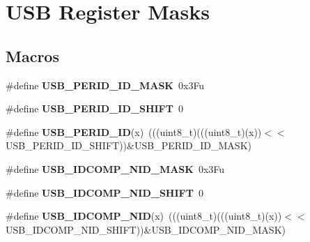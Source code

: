 \hypertarget{group__USB__Register__Masks}{}\section{U\+SB Register Masks}
\label{group__USB__Register__Masks}
\subsection*{Macros}
\begin{DoxyCompactItemize}
\item 
\#define {\bfseries U\+S\+B\+\_\+\+P\+E\+R\+I\+D\+\_\+\+I\+D\+\_\+\+M\+A\+SK}~0x3\+Fu\hypertarget{group__USB__Register__Masks_ga7c4ef4c7ba738b9ec7ee90c6c482c1e5}{}\label{group__USB__Register__Masks_ga7c4ef4c7ba738b9ec7ee90c6c482c1e5}

\item 
\#define {\bfseries U\+S\+B\+\_\+\+P\+E\+R\+I\+D\+\_\+\+I\+D\+\_\+\+S\+H\+I\+FT}~0\hypertarget{group__USB__Register__Masks_ga15b2af97cadcb108b2489e2d29e8957e}{}\label{group__USB__Register__Masks_ga15b2af97cadcb108b2489e2d29e8957e}

\item 
\#define {\bfseries U\+S\+B\+\_\+\+P\+E\+R\+I\+D\+\_\+\+ID}(x)~(((uint8\+\_\+t)(((uint8\+\_\+t)(x))$<$$<$U\+S\+B\+\_\+\+P\+E\+R\+I\+D\+\_\+\+I\+D\+\_\+\+S\+H\+I\+FT))\&U\+S\+B\+\_\+\+P\+E\+R\+I\+D\+\_\+\+I\+D\+\_\+\+M\+A\+SK)\hypertarget{group__USB__Register__Masks_gad306299b648ed1827f0b4a6ad1c81c1d}{}\label{group__USB__Register__Masks_gad306299b648ed1827f0b4a6ad1c81c1d}

\item 
\#define {\bfseries U\+S\+B\+\_\+\+I\+D\+C\+O\+M\+P\+\_\+\+N\+I\+D\+\_\+\+M\+A\+SK}~0x3\+Fu\hypertarget{group__USB__Register__Masks_ga91e5cef0c6203ea503c01ecb0f392819}{}\label{group__USB__Register__Masks_ga91e5cef0c6203ea503c01ecb0f392819}

\item 
\#define {\bfseries U\+S\+B\+\_\+\+I\+D\+C\+O\+M\+P\+\_\+\+N\+I\+D\+\_\+\+S\+H\+I\+FT}~0\hypertarget{group__USB__Register__Masks_gabb5fe5f72dcf289ba2d624ed18f8f07a}{}\label{group__USB__Register__Masks_gabb5fe5f72dcf289ba2d624ed18f8f07a}

\item 
\#define {\bfseries U\+S\+B\+\_\+\+I\+D\+C\+O\+M\+P\+\_\+\+N\+ID}(x)~(((uint8\+\_\+t)(((uint8\+\_\+t)(x))$<$$<$U\+S\+B\+\_\+\+I\+D\+C\+O\+M\+P\+\_\+\+N\+I\+D\+\_\+\+S\+H\+I\+FT))\&U\+S\+B\+\_\+\+I\+D\+C\+O\+M\+P\+\_\+\+N\+I\+D\+\_\+\+M\+A\+SK)\hypertarget{group__USB__Register__Masks_ga00f75febd050c5d7be60f755cc502eae}{}\label{group__USB__Register__Masks_ga00f75febd050c5d7be60f755cc502eae}


\end{DoxyCompactItemize}
